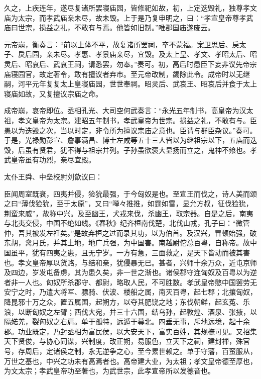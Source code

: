 \documentclass[]{article}
\begin{document}
久之，上疾连年，遂尽复诸所罢寝庙园，皆修祀如故，初，上定迭毁礼，独尊孝文庙为太宗，而孝武庙亲未尽，故未毁。上于是乃复申明之，曰：``孝宣皇帝尊孝武庙曰世宗，损益之礼，不敢有与焉。他皆如旧制。''唯郡国庙遂废云。

元帝崩，衡奏言：``前以上体不平，故复诸所罢祠，卒不蒙福。案卫思后、戾太子、戾后园，亲未尽。孝惠、孝景庙亲尽，宜毁。及太上皇、孝文、孝昭太后、昭灵后、昭哀后、武哀王祠，请悉罢，勿奉。''奏可。初，高后时患臣下妄非议先帝宗庙寝园官，故定著令，敢有擅议者弃市。至元帝改制，蠲除此令。成帝时以无继嗣，河平元年复复太上皇寝庙园，世世奉祠。昭灵后、武哀王、昭哀后并食于太上寝庙如故，又复擅议宗庙之命。

成帝崩，哀帝即位。丞相孔光、大司空何武奏言：``永光五年制书，高皇帝为汉太祖，孝文皇帝为太宗。建昭五年制书，孝武皇帝为世宗。损益之礼，不敢有与。臣愚以为迭毁之次，当以时定，非令所为擅议宗庙之意也。臣请与群臣杂议。''奏可。于是，光禄勋彭宣、詹事满昌、博士左咸等五十三人皆以为继祖宗以下，五庙而迭毁，后虽有贤君，犹不得与祖宗并列。子孙虽欲褒大显扬而立之，鬼神不飨也。孝武皇帝虽有功烈，亲尽宜殿。

太仆王舜、中垒校尉刘歆议曰：

臣闻周室既衰，四夷并侵，猃狁最强，于今匈奴是也。至宣王而伐之，诗人美而颂之曰``薄伐猃狁，至于太原''，又曰``啴々推推，如霆如雷，显允方叔，征伐猃狁，荆蛮来威''，故称中兴。及至幽王，犬戎来伐，杀幽王，取宗器。自是之后，南夷与北夷交侵，中国不绝如线。《春秋》纪齐桓南伐楚，北伐山戎，孔子曰：``微管仲，吾其被发左衽矣。''是故弃桓之过而录其功，以为伯首。及汉兴，冒顿始强，破东胡，禽月氏，并其土地，地广兵强，为中国害。南越尉佗总百粤，自称帝。故中国虽平，犹有四夷之患，且无宁岁。一方有急，三面救之，是天下皆动而被其害也。孝文皇帝厚以货赂，与结和亲，犹侵暴无已。甚者，兴师十余万众，近屯京师及四边，岁发屯备虏，其为患久矣，非一世之渐也。诸侯郡守连匈奴及百粤以为逆者非一人也。匈奴所杀郡守、都尉，略取人民，不可胜数。孝武皇帝愍中国罢劳无安宁之时，乃遣大将军、骠骑、伏波、楼船之属，南灭百粤，起七郡；北攘匈奴，降昆邪十万之众，置五属国，起朔方，以夺其肥饶之地；东伐朝鲜，起玄菟、乐浪，以断匈奴之左臂；西伐大宛，并三十六国，结乌孙，起敦煌、酒泉、张掖，以隔婼羌，裂匈奴之右肩。单于孤特，远遁于幕北。四垂无事，斥地远境，起十余郡。功业既定，乃封丞相为富民侯，以大安天下，富实百姓，其规橅可见。又招集天下贤俊，与协心同谋，兴制度，改正朔，易服色，立天下之祠，建封禅，殊官号，存周后，定诸侯之制，永无逆争之心，至今累世赖之。单于守藩，百蛮服从，万世之基也，中兴之功未有高焉者也。高帝建大业，为太祖；孝文皇帝德至厚也，为文太宗；孝武皇帝功至著也，为武世宗，此孝宣帝所以发德音也。
\end{document}
